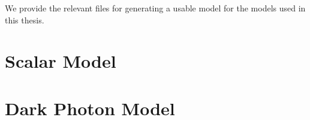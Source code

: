 \label{chapter:modelappendix}
We provide the relevant files for generating a usable \feynrules model for the models used in this thesis.

\section{Scalar Model}


\section{Dark Photon Model}

